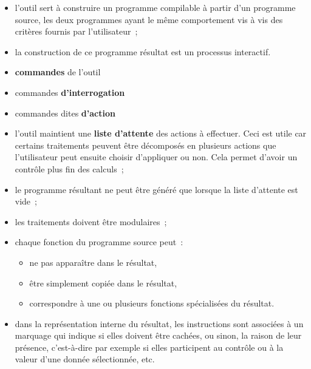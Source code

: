 \begin{itemize}
\item l'outil sert à construire un programme compilable
à partir d'un programme source, les deux programmes ayant le même
comportement vis à vis des critères fournis par l'utilisateur~;
\item la construction de ce programme résultat est un processus interactif.
\item {\bf commandes} de l'outil
\item commandes {\bf d'interrogation}
\item commandes dites {\bf d'action}
\item l'outil maintient une {\bf liste d'attente} des actions à effectuer.
Ceci est utile car certains traitements peuvent être décomposés
en plusieurs actions que l'utilisateur peut ensuite choisir d'appliquer ou non.
Cela permet d'avoir un contrôle plus fin des calculs~;
\item le programme résultant ne peut être généré
que lorsque la liste d'attente est vide~;
\item les traitements doivent être modulaires~;
\item chaque fonction du programme source peut~:
  \begin{itemize}
  \item ne pas apparaître dans le résultat,
  \item être simplement copiée dans le résultat,
  \item correspondre à une ou plusieurs fonctions spécialisées du résultat.
  \end{itemize}
\item dans la représentation interne du résultat, les instructions
sont associées à un marquage qui indique si elles doivent être cachées,
ou sinon, la raison de leur présence, c'est-à-dire par exemple
si elles participent au contrôle ou à la valeur d'une donnée sélectionnée, etc.


\end{itemize}
